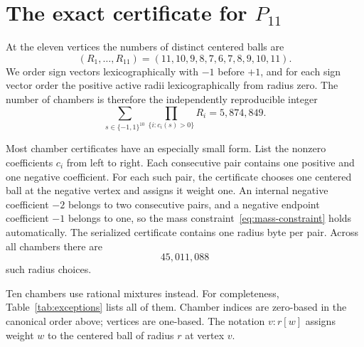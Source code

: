 \documentclass[11pt]{amsart}
\theoremstyle{definition}
\begin{document}
\section{The exact certificate for \texorpdfstring{$P_{11}$}{P11}}

At the eleven vertices the numbers of distinct centered balls are
\begin{equation}\label{eq:radius-counts}
  (R_1,\ldots,R_{11})=(11,10,9,8,7,6,7,8,9,10,11).
\end{equation}
We order sign vectors lexicographically with $-1$ before $+1$, and for each
sign vector order the positive active radii lexicographically from radius
zero.  The number of chambers is therefore the independently reproducible
integer
\begin{equation}\label{eq:chamber-count}
  \sum_{s\in\{-1,1\}^{10}}
  \prod_{\{i:c_i(s)>0\}}R_i
  =5{,}874{,}849.
\end{equation}

Most chamber certificates have an especially small form.  List the nonzero
coefficients $c_i$ from left to right.  Each consecutive pair contains one
positive and one negative coefficient.  For each such pair, the certificate
chooses one centered ball at the negative vertex and assigns it weight one.
An internal negative coefficient $-2$ belongs to two consecutive pairs, and
a negative endpoint coefficient $-1$ belongs to one, so the mass
constraint~\eqref{eq:mass-constraint} holds automatically.  The serialized
certificate contains one radius byte per pair.  Across all chambers there
are
\begin{equation}\label{eq:slot-count}
  45{,}011{,}088
\end{equation}
such radius choices.

Ten chambers use rational mixtures instead.  For completeness,
Table~\ref{tab:exceptions} lists all of them.  Chamber indices are zero-based
in the canonical order above; vertices are one-based.  The notation
$v:r[w]$ assigns weight $w$ to the centered ball of radius $r$ at vertex $v$.
\end{document}
